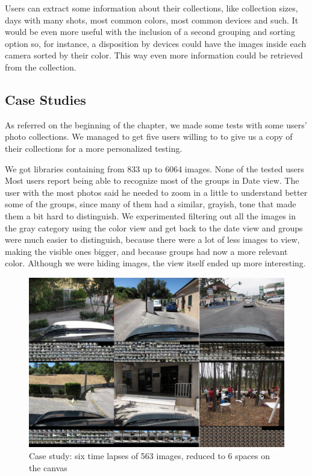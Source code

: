 {Users can extract some information about their collections, like collection sizes, days with many shots, most common colors, most common devices and such. It would be even more useful with the inclusion of a second grouping and sorting option so, for instance, a disposition by devices could have the images inside each camera sorted by their color. This way even more information could be retrieved from the collection.





\subsection{Case Studies}

As referred on the beginning of the chapter, we made some tests with some users' photo collections. We managed to get five users willing to to give us a copy of their collections for a more personalized testing.

We got libraries containing from 833 up to 6064 images. None of the tested users  Most users report being able to recognize most of the  groups in Date view. The user with the most photos said he needed to zoom in a little to understand better some of the groups, since many of them had a similar, grayish, tone that made them a bit hard to distinguish. We experimented filtering out all the images in the gray category using the color view and get back to the date view and groups were much easier to distinguish, because there were a lot of less images to view, making the visible ones bigger, and because groups had now a more relevant color. Although we were hiding images, the view itself ended up more interesting.

\begin{figure}
	\vspace{-20pt}
	\begin{center}
		\includegraphics[width=\linewidth]{../Figures/filcab-time-lapse-563-imgs-to-6.png}
	\end{center}
	\vspace{-20pt}
	\caption{Case study: six time lapses of 563 images, reduced to 6 spaces on the canvas}
	\vspace{-5pt}
	\label{fig:filcab:stacks}
\end{figure}

}
